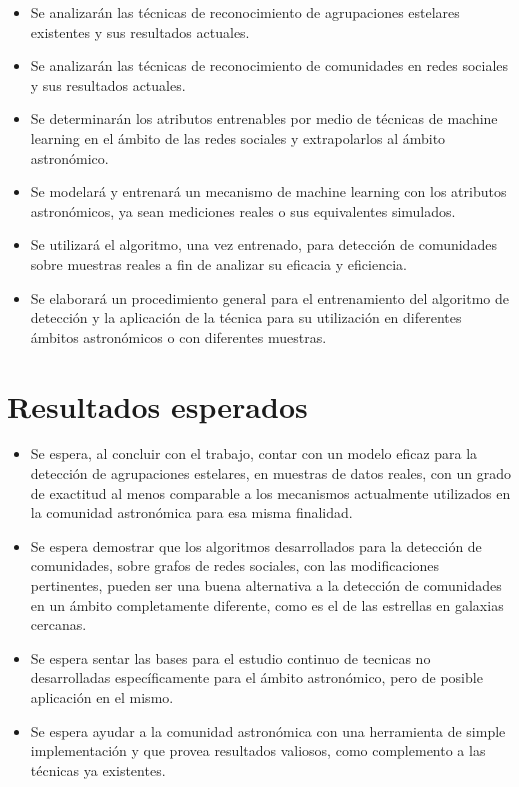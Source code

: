 \documentclass[
	11pt,oneside,a4paper,
	headsepline,footsepline,plainfootsepline,plainheadsepline,
	fleqn,
]{article}
\begin{document}
\begin{itemize}
	\item Se analizarán las técnicas de reconocimiento de agrupaciones estelares existentes y sus resultados actuales.
	\item Se analizarán las técnicas de reconocimiento de comunidades en redes sociales y sus resultados actuales.
	\item Se determinarán los atributos entrenables por medio de técnicas de machine learning en el ámbito de las redes sociales y extrapolarlos al ámbito astronómico.
	\item Se modelará y entrenará un mecanismo de machine learning con los atributos astronómicos, ya sean mediciones reales o sus equivalentes simulados.
	\item Se utilizará el algoritmo, una vez entrenado, para detección de comunidades sobre muestras reales a fin de analizar su eficacia y eficiencia.
	\item Se elaborará un procedimiento general para el entrenamiento del algoritmo de detección y la aplicación de la técnica para su utilización en diferentes ámbitos astronómicos o con diferentes muestras.
\end{itemize}

\section{Resultados esperados}

\begin{itemize}
	\item Se espera, al concluir con el trabajo, contar con un modelo eficaz para la detección de agrupaciones estelares, en muestras de datos reales, con un grado de exactitud al menos comparable a los mecanismos actualmente utilizados en la comunidad astronómica para esa misma finalidad.
	\item Se espera demostrar que los algoritmos desarrollados para la detección de comunidades, sobre grafos de redes sociales, con las modificaciones pertinentes, pueden ser una buena alternativa a la detección de comunidades en un ámbito completamente diferente, como es el de las estrellas en galaxias cercanas.
	\item Se espera sentar las bases para el estudio continuo de tecnicas no desarrolladas específicamente para el ámbito astronómico, pero de posible aplicación en el mismo.
	\item Se espera ayudar a la comunidad astronómica con una herramienta de simple implementación y que provea resultados valiosos, como complemento a las técnicas ya existentes.
\end{itemize}
\end{document}
